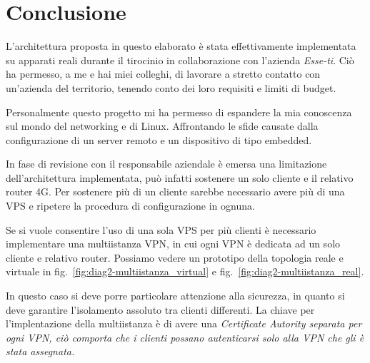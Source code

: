 \chapter{Conclusione \workinprogress}

L'architettura proposta in questo elaborato è stata effettivamente implementata su apparati reali durante il tirocinio in collaborazione con l'azienda \textit{Esse-ti}. Ciò ha permesso, a me e hai miei colleghi, di lavorare a stretto contatto con un'azienda del territorio, tenendo conto dei loro requisiti e limiti di budget.


Personalmente questo progetto mi ha permesso di espandere la mia conoscenza sul mondo del networking e di Linux. Affrontando le sfide causate dalla configurazione di un server remoto e un dispositivo di tipo embedded.


In fase di revisione con il responsabile aziendale è emersa una limitazione dell'architettura implementata, può infatti sostenere un solo cliente e il relativo router 4G. Per sostenere più di un cliente sarebbe necessario avere più di una VPS e ripetere la procedura di configurazione in ognuna.


Se si vuole consentire l'uso di una sola VPS per più clienti è necessario implementare una multiistanza VPN, in cui ogni VPN è dedicata ad un solo cliente e relativo router. Possiamo vedere un prototipo della topologia reale e virtuale in fig.~\ref{fig:diag2-multiistanza_virtual} e fig.~\ref{fig:diag2-multiistanza_real}.

In questo caso si deve porre particolare attenzione alla sicurezza, in quanto si deve garantire l'isolamento assoluto tra clienti differenti. La chiave per l'implentazione della multiistanza è di avere una \it{Certificate Autority} separata per ogni VPN, ciò comporta che i clienti possano autenticarsi solo alla VPN che gli è stata assegnata.



